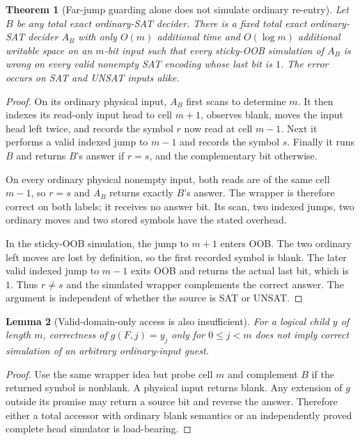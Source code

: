 \documentclass[11pt]{article}
\newtheorem{theorem}{Theorem}
\newtheorem{lemma}[theorem]{Lemma}
\begin{document}
\begin{theorem}[Far-jump guarding alone does not simulate ordinary re-entry]
Let $B$ be any total exact ordinary-SAT decider.  There is a fixed total exact
ordinary-SAT decider $A_B$ with only $O(m)$ additional time and
$O(\log m)$ additional writable space on an $m$-bit input such that every
sticky-OOB simulation of $A_B$ is wrong on every valid nonempty SAT encoding
whose last bit is $1$.  The error occurs on SAT and UNSAT inputs alike.
\end{theorem}
\begin{proof}
On its ordinary physical input, $A_B$ first scans to determine $m$.  It then
indexes its read-only input head to cell $m+1$, observes blank, moves the input
head left twice, and records the symbol $r$ now read at cell $m-1$.  Next it
performs a valid indexed jump to $m-1$ and records the symbol $s$.  Finally it
runs $B$ and returns $B$'s answer if $r=s$, and the complementary bit otherwise.

On every ordinary physical nonempty input, both reads are of the same cell
$m-1$, so $r=s$ and $A_B$ returns exactly $B$'s answer.  The wrapper is
therefore correct on both labels; it receives no answer bit.  Its scan, two
indexed jumps, two ordinary moves and two stored symbols have the stated
overhead.

In the sticky-OOB simulation, the jump to $m+1$ enters OOB.  The two ordinary
left moves are lost by definition, so the first recorded symbol is blank.
The later valid indexed jump to $m-1$ exits OOB and returns the actual last
bit, which is $1$.  Thus $r\ne s$ and the simulated wrapper complements the
correct answer.  The argument is independent of whether the source is SAT or
UNSAT.  \qedhere
\end{proof}

\begin{lemma}[Valid-domain-only access is also insufficient]
For a logical child $y$ of length $m$, correctness of
$g(F,j)=y_j$ only for $0\le j<m$ does not imply correct simulation of an
arbitrary ordinary-input guest.
\end{lemma}
\begin{proof}
Use the same wrapper idea but probe cell $m$ and complement $B$ if the returned
symbol is nonblank.  A physical input returns blank.  Any extension of $g$
outside its promise may return a source bit and reverse the answer.  Therefore
either a total accessor with ordinary blank semantics or an independently
proved complete head simulator is load-bearing.
\end{proof}
\end{document}
